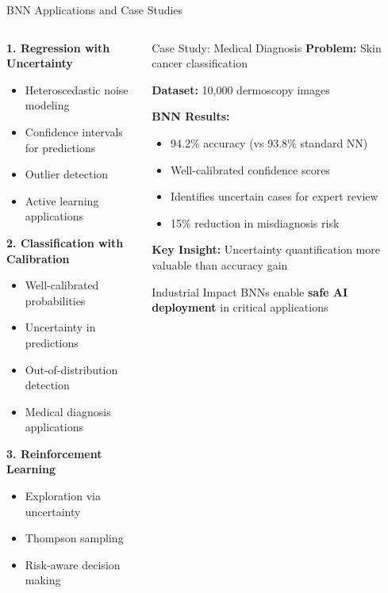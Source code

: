 \documentclass[aspectratio=169,11pt]{beamer}
\begin{document}
\begin{frame}{BNN Applications and Case Studies}
\begin{columns}
\begin{column}{0.5\textwidth}
\textbf{1. Regression with Uncertainty}
\begin{itemize}
\item Heteroscedastic noise modeling
\item Confidence intervals for predictions
\item Outlier detection
\item Active learning applications
\end{itemize}

\textbf{2. Classification with Calibration}
\begin{itemize}
\item Well-calibrated probabilities
\item Uncertainty in predictions
\item Out-of-distribution detection
\item Medical diagnosis applications
\end{itemize}

\textbf{3. Reinforcement Learning}
\begin{itemize}
\item Exploration via uncertainty
\item Thompson sampling
\item Risk-aware decision making
\end{itemize}
\end{column}
\begin{column}{0.5\textwidth}
\begin{block}{Case Study: Medical Diagnosis}
\textbf{Problem:} Skin cancer classification

\textbf{Dataset:} 10,000 dermoscopy images

\textbf{BNN Results:}
\begin{itemize}
\item 94.2\% accuracy (vs 93.8\% standard NN)
\item \textcolor{forest}{Well-calibrated} confidence scores
\item Identifies uncertain cases for expert review
\item 15\% reduction in misdiagnosis risk
\end{itemize}

\textbf{Key Insight:} Uncertainty quantification more valuable than accuracy gain
\end{block}

\begin{alertblock}{Industrial Impact}
BNNs enable \textbf{safe AI deployment} in critical applications
\end{alertblock}
\end{column}
\end{columns}
\end{frame}
\end{document}
